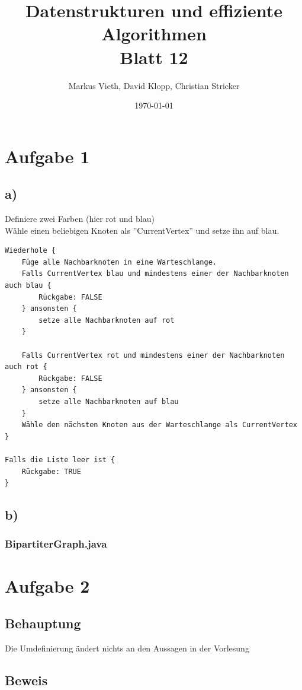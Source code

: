 \documentclass[a4paper,11pt,twoside]{scrartcl}
\title{Datenstrukturen und effiziente Algorithmen\\ Blatt 12}
\author{Markus Vieth, David Klopp, Christian Stricker}
\date{\today}
\begin{document}
\maketitle
\cleardoublepage
\pagestyle{myheadings}

\section*{Aufgabe 1}
\subsection*{a)} 
Definiere zwei Farben (hier rot und blau)\\
Wähle einen beliebigen Knoten als ''CurrentVertex'' und setze ihn auf blau.\\

\begin{lstlisting}[basicstyle=\scriptsize\ttfamily]
Wiederhole {
	Füge alle Nachbarknoten in eine Warteschlange.
	Falls CurrentVertex blau und mindestens einer der Nachbarknoten auch blau {
		Rückgabe: FALSE
	} ansonsten {
		setze alle Nachbarknoten auf rot
	}
	
	Falls CurrentVertex rot und mindestens einer der Nachbarknoten auch rot {
		Rückgabe: FALSE
	} ansonsten {
		setze alle Nachbarknoten auf blau
	}
	Wähle den nächsten Knoten aus der Warteschlange als CurrentVertex
}

Falls die Liste leer ist {
	Rückgabe: TRUE
}
\end{lstlisting}
\subsection*{b)}
\subsubsection*{\footnotesize BipartiterGraph.java}

\section*{Aufgabe 2}
\subsection*{Behauptung}
Die Umdefinierung ändert nichts an den Aussagen in der Vorlesung
\subsection*{Beweis}
\end{document}
